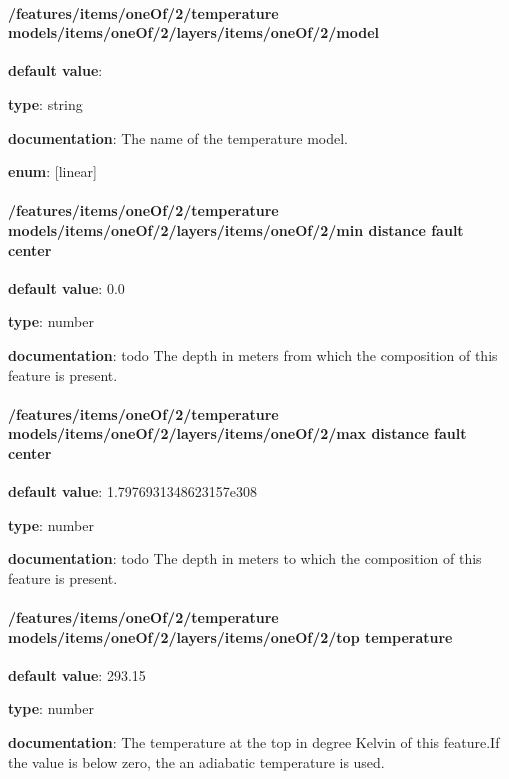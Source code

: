 \paragraph{/features/items/oneOf/2/temperature models/items/oneOf/2/layers/items/oneOf/2/model} \begin{itemized}
\item {\bf default value}: 
\item {\bf type}: string
\item {\bf documentation}: The name of the temperature model.
\item {\bf enum}: [linear]\end{itemized}\paragraph{/features/items/oneOf/2/temperature models/items/oneOf/2/layers/items/oneOf/2/min distance fault center} \begin{itemized}
\item {\bf default value}: 0.0
\item {\bf type}: number
\item {\bf documentation}: todo The depth in meters from which the composition of this feature is present.
\end{itemized}\paragraph{/features/items/oneOf/2/temperature models/items/oneOf/2/layers/items/oneOf/2/max distance fault center} \begin{itemized}
\item {\bf default value}: 1.7976931348623157e308
\item {\bf type}: number
\item {\bf documentation}: todo The depth in meters to which the composition of this feature is present.
\end{itemized}\paragraph{/features/items/oneOf/2/temperature models/items/oneOf/2/layers/items/oneOf/2/top temperature} \begin{itemized}
\item {\bf default value}: 293.15
\item {\bf type}: number
\item {\bf documentation}: The temperature at the top in degree Kelvin of this feature.If the value is below zero, the an adiabatic temperature is used.

\end{itemized}
